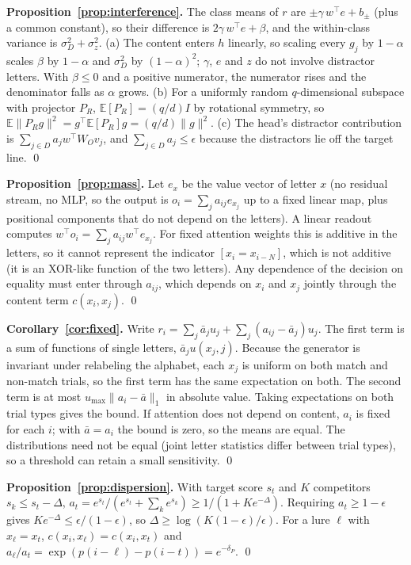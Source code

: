 \documentclass{article}
\begin{document}
\textbf{Proposition~\ref{prop:interference}.} The class means of $r$ are $\pm\gamma\,w^\top e+b_{\pm}$ (plus a common constant), so their difference is $2\gamma\,w^\top e+\beta$, and the within-class variance is $\sigma_D^2+\sigma_z^2$. (a) The content enters $h$ linearly, so scaling every $g_j$ by $1-\alpha$ scales $\beta$ by $1-\alpha$ and $\sigma_D^2$ by $(1-\alpha)^2$; $\gamma$, $e$ and $z$ do not involve distractor letters. With $\beta\le0$ and a positive numerator, the numerator rises and the denominator falls as $\alpha$ grows. (b) For a uniformly random $q$-dimensional subspace with projector $P_R$, $\mathbb{E}[P_R]=(q/d)I$ by rotational symmetry, so $\mathbb{E}\|P_Rg\|^2=g^\top\mathbb{E}[P_R]g=(q/d)\|g\|^2$. (c) The head's distractor contribution is $\sum_{j\in D}a_jw^\top W_Ov_j$, and $\sum_{j\in D}a_j\le\epsilon$ because the distractors lie off the target line. \qed

\textbf{Proposition~\ref{prop:mass}.} Let $e_x$ be the value vector of letter $x$ (no residual stream, no MLP, so the output is $o_i=\sum_j a_{ij}e_{x_j}$ up to a fixed linear map, plus positional components that do not depend on the letters). A linear readout computes $w^\top o_i=\sum_j a_{ij}w^\top e_{x_j}$. For fixed attention weights this is additive in the letters, so it cannot represent the indicator $[x_i=x_{i-N}]$, which is not additive (it is an XOR-like function of the two letters). Any dependence of the decision on equality must enter through $a_{ij}$, which depends on $x_i$ and $x_j$ jointly through the content term $c(x_i,x_j)$. \qed

\textbf{Corollary~\ref{cor:fixed}.} Write $r_i=\sum_j\bar a_ju_j+\sum_j(a_{ij}-\bar a_j)u_j$. The first term is a sum of functions of single letters, $\bar a_j u(x_j,j)$. Because the generator is invariant under relabeling the alphabet, each $x_j$ is uniform on both match and non-match trials, so the first term has the same expectation on both. The second term is at most $u_{\max}\|a_i-\bar a\|_1$ in absolute value. Taking expectations on both trial types gives the bound. If attention does not depend on content, $a_i$ is fixed for each $i$; with $\bar a=a_i$ the bound is zero, so the means are equal. The distributions need not be equal (joint letter statistics differ between trial types), so a threshold can retain a small sensitivity. \qed

\textbf{Proposition~\ref{prop:dispersion}.} With target score $s_t$ and $K$ competitors $s_k\le s_t-\Delta$, $a_t=e^{s_t}/(e^{s_t}+\sum_k e^{s_k})\ge 1/(1+Ke^{-\Delta})$. Requiring $a_t\ge1-\epsilon$ gives $Ke^{-\Delta}\le\epsilon/(1-\epsilon)$, so $\Delta\ge\log(K(1-\epsilon)/\epsilon)$. For a lure $\ell$ with $x_\ell=x_t$, $c(x_i,x_\ell)=c(x_i,x_t)$ and $a_\ell/a_t=\exp(p(i-\ell)-p(i-t))=e^{-\delta_P}$. \qed
\end{document}
